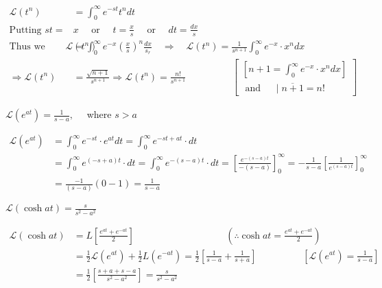 \begin{answer}
	\begin{align*}
	\mathcal{L}\left(t^{n}\right)&=\int_{0}^{\infty} e^{-s t} t^{n} d t\\
	\text{Putting }s t=&x \quad\text{ or }\quad t=\frac{x}{s} \quad\text{ or } \quad d t=\frac{d x}{s}\\
	\text{Thus we have}\mathcal{L}\left(t^{n}\right)&=\int_{0}^{\infty} e^{-x}\left(\frac{x}{s}\right)^{n} \frac{d x}{s_{r}} \quad \Rightarrow \quad \mathcal{L}\left(t^{n}\right)=\frac{1}{s^{n+1}} \int_{0}^{\infty} e^{-x} \cdot x^{n} d x\\
	\Rightarrow \mathcal{L}\left(t^{n}\right)&=\frac{\sqrt{n+1}}{s^{n+1}} \Rightarrow \mathcal{L}\left(t^{n}\right)=\frac{n !}{s^{n+1}}\hspace{2cm}\left[\begin{array}{c}
	{\left[n+1=\int_{0}^{\infty} e^{-x} \cdot x^{n} d x\right] } \\
	\text { and } \quad \mid \overline{n+1}=n !
	\end{array}\right]
	\end{align*}
\end{answer}
\begin{exercise}
	$\mathcal{L}\left(e^{a t}\right)=\frac{1}{s-a}, \quad$ where $s>a$
\end{exercise}
\begin{answer}
	\begin{align*}
	\mathcal{L}\left(e^{a t}\right) &=\int_{0}^{\infty} e^{-s t} \cdot e^{a t} d t=\int_{0}^{\infty} e^{-s t+a t} \cdot d t \\
	&=\int_{0}^{\infty} e^{(-s+a) t} \cdot d t=\int_{0}^{\infty} e^{-(s-a) t} \cdot d t=\left[\frac{e^{-(s-a) t}}{-(s-a)}\right]_{0}^{\infty}=-\frac{1}{s-a}\left[\frac{1}{e^{(s-a) t}}\right]_{0}^{\infty}\\
	&=\frac{-1}{(s-a)}(0-1)=\frac{1}{s-a}
	\end{align*}
\end{answer}
\begin{exercise}
	$\mathcal{L}(\cosh a t)=\frac{s}{s^{2}-a^{2}}$
\end{exercise}
\begin{answer}
	\begin{align*}
	\mathcal{L}(\cosh a t) &=L\left[\frac{e^{a t}+e^{-a t}}{2}\right] \hspace{4cm}\left(\therefore \cosh a t=\frac{e^{a t}+e^{-a t}}{2}\right)\\
	&=\frac{1}{2} \mathcal{L}\left(e^{a t}\right)+\frac{1}{2} L\left(e^{-a t}\right)=\frac{1}{2}\left[\frac{1}{s-a}+\frac{1}{s+a}\right] \hspace{2cm}\left[\mathcal{L}\left(e^{a t}\right)=\frac{1}{s-a}\right]\\
	&=\frac{1}{2}\left[\frac{s+a+s-a}{s^{2}-a^{2}}\right]=\frac{s}{s^{2}-a^{2}}
	\end{align*}
\end{answer}
